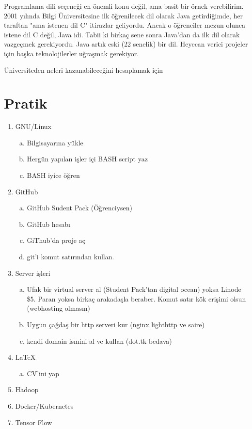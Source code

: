 \documentclass[a4paper,10pt]{article}
\begin{document}
Programlama dili seçeneği en önemli konu değil, ama basit bir örnek verebilirim. 2001 yılında Bilgi Üniversitesine ilk öğrenilecek dil olarak Java getirdiğimde, her taraftan "ama istenen dil C" itirazlar geliyordu. Ancak o öğrenciler mezun olunca istene dil C değil, Java idi. Tabii ki birkaç sene sonra Java'dan da ilk dil olarak vazgeçmek gerekiyordu. Java artık eski (22 senelik) bir dil. Heyecan verici projeler için başka teknolojilerler uğraşmak gerekiyor.

Üniversiteden neleri kazanabileceğini hesaplamak için       

\section*{Pratik}
\begin{enumerate}
  \item GNU/Linux
    \begin{enumerate}[(a)]
      \item Bilgisayarına yükle 
      \item Hergün yapılan işler içi BASH script yaz
      \item BASH iyice öğren
    \end{enumerate}
  \item GitHub
    \begin{enumerate}[(a)]
      \item GitHub Sudent Pack (Öğrenciysen)
      \item GitHub hesabı
      \item GiThub'da proje aç
      \item git'i komut satırından kullan.
    \end{enumerate}
  \item Server işleri
    \begin{enumerate}[(a)]
      \item Ufak bir virtual server al (Student Pack'tan digital ocean) yoksa Linode \$5. Paran yoksa birkaç arakadaşla beraber. Komut satır kök erişimi olsun (webhosting olmasın)
      \item Uygun çağdaş bir http serveri kur (nginx lighthttp ve saire)
      \item kendi domain ismini al ve kullan (dot.tk bedava)
    \end{enumerate}
  \item \LaTeX 
    \begin{enumerate}[(a)]
      \item CV'ini yap
    \end{enumerate}
   \item Hadoop
   \item Docker/Kubernetes
   \item Tensor Flow
    
\end{enumerate}
\end{document}
